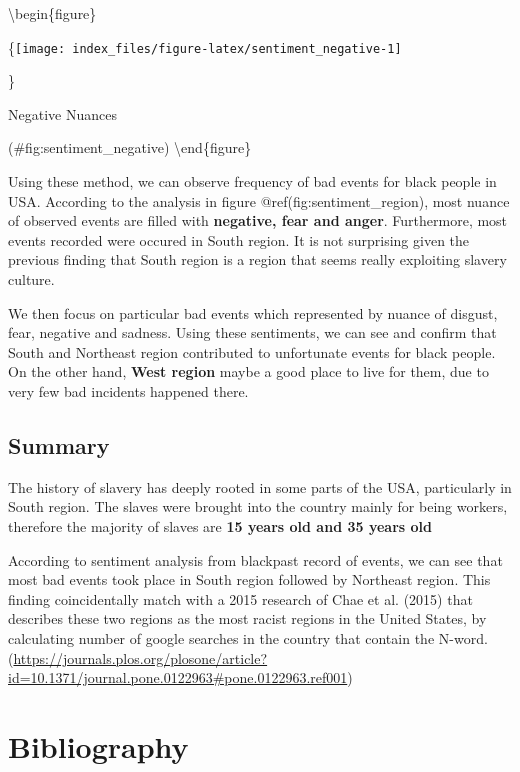 \documentclass[
]{article}
\begin{document}
\textbackslash begin\{figure\}

\{\centering \texttt{[image: index\_files/figure-latex/sentiment\_negative-1]}

\}

\caption{Negative Nuances}

(\#fig:sentiment\_negative)
\textbackslash end\{figure\}

Using these method, we can observe frequency of bad events for black people in USA. According to the analysis in figure @ref(fig:sentiment\_region), most nuance of observed events are filled with \textbf{negative, fear and anger}. Furthermore, most events recorded were occured in South region. It is not surprising given the previous finding that South region is a region that seems really exploiting slavery culture.

We then focus on particular bad events which represented by nuance of disgust, fear, negative and sadness. Using these sentiments, we can see and confirm that South and Northeast region contributed to unfortunate events for black people. On the other hand, \textbf{West region} maybe a good place to live for them, due to very few bad incidents happened there.

\hypertarget{summary}{%
\subsection{Summary}\label{summary}}

The history of slavery has deeply rooted in some parts of the USA, particularly in South region. The slaves were brought into the country mainly for being workers, therefore the majority of slaves are \textbf{15 years old and 35 years old}

According to sentiment analysis from blackpast record of events, we can see that most bad events took place in South region followed by Northeast region. This finding coincidentally match with a 2015 research of Chae et al. (2015) that describes these two regions as the most racist regions in the United States, by calculating number of google searches in the country that contain the N-word.
(\url{https://journals.plos.org/plosone/article?id=10.1371/journal.pone.0122963\#pone.0122963.ref001})

\hypertarget{bibliography}{%
\section*{Bibliography}\label{bibliography}}
\end{document}
